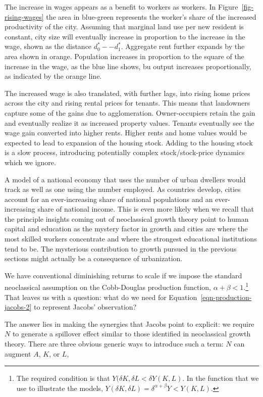 The increase in wages appears  as a benefit to workers as workers. In Figure~\ref{fig-rising-wages} the area in blue-green represents the worker's share of the increased productivity of the city. Assuming that marginal land use per new resident is constant, city size will eventually increase in proportion to the increase in the wage, shown as the distance $d^*_0--d^*_1$. Aggregate rent  further expands by the area shown in orange. Population increases in proportion to the square of the increase in the wage, as  the blue line shows, bu output increases proportionally, as indicated by  the orange line. 

The increased wage is also translated, with further lags, into rising home prices across the city and rising rental prices for tenants. This means that landowners capture some of the gains due to agglomeration. Owner-occupiers retain the gain and eventually realize it as increased  property values. Tenants eventually see the wage gain converted into higher rents. Higher rents and home values would be expected to lead to expansion of the housing stock. Adding to the housing stock is a slow process, introducing potentially complex stock/stock-price dynamics which we ignore.

A model of a national economy that uses the number of urban dwellers would track as well as one using the number employed. As countries develop, cities account for an ever-increasing share of  national populations and an ever-increasing share of national income.  This is  even more likely when we recall that the principle insights coming out of neoclassical growth theory point to human capital and education as the mystery factor in growth and cities are where the most skilled workers concentrate and where the strongest educational institutions tend to be. The mysterious contribution to growth pursued in the previous sections might  actually be a consequence of urbanization.

We have conventional diminishing returns to scale  if we impose the standard neoclassical assumption on the \gls{Cobb-Douglas} production function, 
$\alpha +\beta <1 $.\footnote{
The required condition is that 
$Y(\delta K,\delta L< \delta Y(K,L)$. 
In the function that we use to illustrate the models, 
$Y(\delta K,\delta L)= \delta^{\alpha +\beta}Y < Y(K,L)$.} 
That leaves us with a question: what do we need for Equation~\ref{eqn-production-jacobs-2} to represent Jacobs' observation?  

The answer lies in making the synergies that Jacobs point to explicit: we require $N$ to generate a spillover effect similar to those  identified in neoclassical growth theory. There are three obvious generic ways to introduce such a term: $N$ can augment $A$, $K$, or $L$, 

